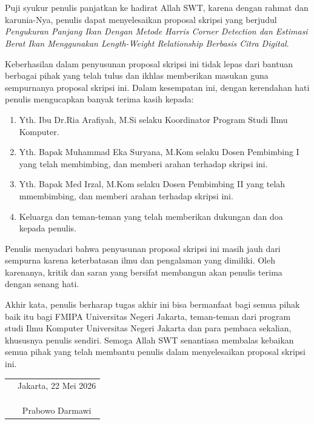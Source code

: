\chapter*{}

Puji syukur penulis panjatkan ke hadirat Allah SWT, karena dengan rahmat dan
karunia-Nya, penulis dapat menyelesaikan proposal skripsi yang berjudul
\textit{Pengukuran Panjang Ikan Dengan Metode Harris Corner Detection dan Estimasi Berat Ikan Menggunakan Length-Weight Relationship Berbasis Citra Digital}.

Keberhasilan dalam penyusunan proposal skripsi ini tidak lepas dari bantuan
berbagai pihak yang telah tulus dan ikhlas memberikan masukan guna sempurnanya proposal skripsi ini. Dalam kesempatan ini, dengan
kerendahan hati penulis mengucapkan banyak terima kasih kepada:

\begin{enumerate}
	\setlength{\parskip}{0pt}
	\item Yth. Ibu Dr.Ria Arafiyah, M.Si selaku Koordinator Program Studi Ilmu Komputer.
	\item Yth. Bapak Muhammad Eka Suryana, M.Kom selaku Dosen Pembimbing I yang telah membimbing, dan memberi arahan terhadap skripsi ini.
	\item Yth. Bapak Med Irzal, M.Kom selaku Dosen Pembimbing II yang telah mmembimbing, dan memberi arahan terhadap skripsi ini.
	\item Keluarga dan teman-teman yang telah memberikan dukungan dan doa kepada penulis.
\end{enumerate}

Penulis menyadari bahwa penyusunan proposal skripsi ini masih jauh dari sempurna
karena keterbatasan ilmu dan pengalaman yang dimiliki. Oleh karenanya, kritik
dan saran yang bersifat membangun akan penulis terima dengan senang hati. 

Akhir kata, penulis berharap tugas akhir ini bisa bermanfaat bagi semua pihak baik itu bagi FMIPA Universitas Negeri Jakarta, teman-teman dari program studi Ilmu
Komputer Universitas Negeri Jakarta dan para pembaca sekalian, khususnya penulis sendiri. Semoga Allah SWT senantiasa membalas kebaikan semua pihak yang telah membantu penulis dalam menyelesaikan proposal skripsi ini.

\vspace{1cm}

\begin{tabular}{p{7.5cm}c}
	&Jakarta, 22 Mei 2026 \\
	&\\
	&\\
	&\\
	&Prabowo Darmawi
\end{tabular}
